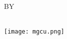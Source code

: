 \begin{titlepage}
\begin{center}
\uppercase{By}\\[0cm]

\uppercase{\textbf{\fAuthorC}}\\[1cm]




\centerline{\texttt{[image: mgcu.png]}}
\vfill
\vspace{1cm}
\normalsize{\departmentC}\\[-0.1cm] %

{\scshape\Large \UniversityC \par}\vspace{1cm} %
\vfill


\vfill

\end{center}
\end{titlepage}